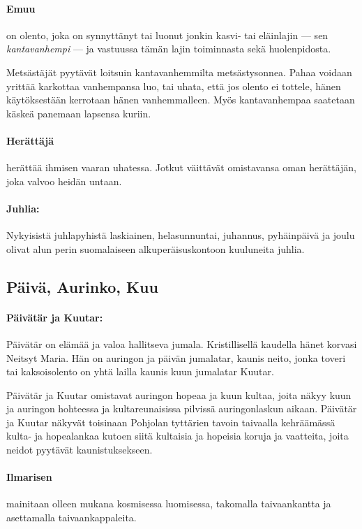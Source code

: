   \paragraph{Emuu} on olento, joka on synnyttänyt tai luonut jonkin kasvi- tai eläinlajin ---
    sen \emph{kantavanhempi} --- ja vastuussa tämän lajin toiminnasta sekä huolenpidosta. \par
    Metsästäjät pyytävät loitsuin kantavanhemmilta metsästysonnea. Pahaa voidaan yrittää karkottaa
    vanhempansa luo, tai uhata, että jos olento ei tottele, hänen käytöksestään kerrotaan hänen
    vanhemmalleen. Myös kantavanhempaa saatetaan käskeä panemaan lapsensa kuriin.
  \paragraph{Herättäjä} herättää ihmisen vaaran uhatessa. Jotkut väittävät omistavansa oman
    herättäjän, joka valvoo heidän untaan.
  \paragraph{Juhlia:} Nykyisistä juhlapyhistä laskiainen, helasunnuntai, juhannus, pyhäinpäivä ja 
    joulu olivat alun perin suomalaiseen alkuperäisuskontoon kuuluneita juhlia.


\subsection{Päivä, Aurinko, Kuu}

  \paragraph{Päivätär ja Kuutar:} Päivätär on elämää ja valoa hallitseva jumala. Kristillisellä
    kaudella hänet korvasi Neitsyt Maria. Hän on auringon ja päivän jumalatar, kaunis neito,
    jonka toveri tai kaksois\-olento on yhtä lailla kaunis kuun jumalatar Kuutar. \par
    Päivätär ja Kuutar omistavat auringon hopeaa ja kuun kultaa, joita näkyy kuun ja auringon
    hohteessa ja kultareunaisissa pilvissä auringonlaskun aikaan. Päivätär ja Kuutar näkyvät
    toisinaan Pohjolan tyttärien tavoin taivaalla kehräämässä kulta- ja hopealankaa kutoen
    siitä kultaisia ja hopeisia koruja ja vaatteita, joita neidot pyytävät kaunistuksekseen.

  \paragraph{Ilmarisen} mainitaan olleen mukana kosmisessa luomisessa, takomalla taivaankantta
    ja asettamalla taivaankappaleita.

